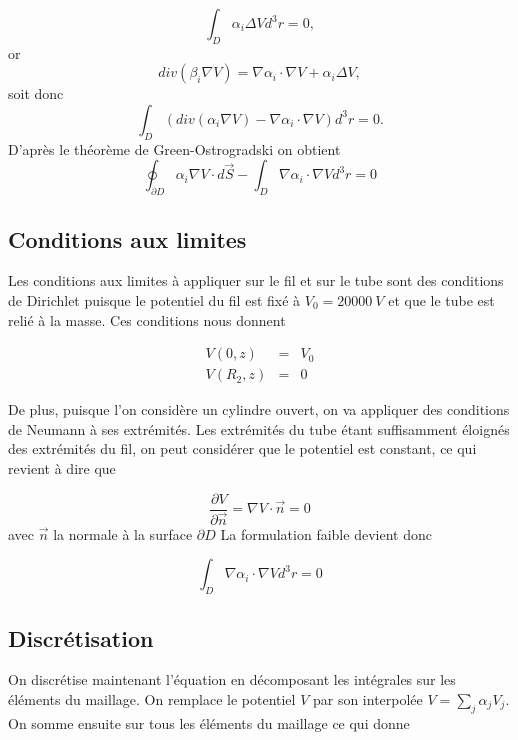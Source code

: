 \documentclass[a4paper,12pt]{article}
\begin{document}
\begin{equation}
\int_{D} \alpha_i \Delta V d^3r = 0,
\end{equation}
or
\begin{equation}
div(\beta_i \nabla V) = \nabla \alpha_i \cdot \nabla V + \alpha_i \Delta V,
\end{equation}
soit donc
\begin{equation}
\int_{D} \left( div(\alpha_i \nabla V) - \nabla\alpha_i \cdot \nabla V \right) d^3r = 0.
\end{equation}
D'après le théorème de Green-Ostrogradski on obtient
\begin{equation}
\oint_{\partial D} \alpha_i \nabla V \cdot d\vec{S} - \int_{D} \nabla \alpha_i \cdot \nabla V d^3 r = 0
\end{equation}

\subsection{Conditions aux limites}
Les conditions aux limites à appliquer sur le fil et sur le tube sont des conditions de Dirichlet puisque le potentiel du fil est fixé à $V_0=\SI{20000}{V}$ et que le tube est relié à la masse. Ces conditions nous donnent



\begin{eqnarray}
V(0,z) &=& V_0 \\
V(R_2,z) &=& 0
\end{eqnarray}


De plus, puisque l'on considère un cylindre ouvert, on va appliquer des conditions de Neumann à ses extrémités. Les extrémités du tube étant suffisamment éloignés des extrémités du fil, on peut considérer que le potentiel est constant, ce qui revient à dire que

\begin{equation}
\frac{\partial V}{\partial \vec{n} } = \nabla V \cdot \vec{n} = 0
\end{equation}
avec $\vec{n}$ la normale à la surface $\partial D$
La formulation faible devient donc

\begin{equation}
\int_{D} \nabla \alpha_i \cdot \nabla V d^3 r = 0
\end{equation}

\subsection{Discrétisation}
On discrétise maintenant l'équation en décomposant les intégrales sur les éléments du maillage. On remplace le potentiel $V$ par son interpolée $V = \sum_{j} \alpha_j V_j$. On somme ensuite sur tous les éléments du maillage ce qui donne
\end{document}
